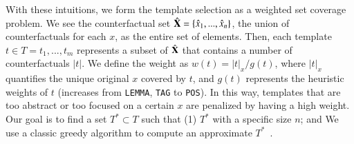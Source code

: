 With these intuitions, we form the template selection as a weighted set coverage problem.
We see the counterfactual set $\hat{\mathbf{X}} = \{\hat{x}_1,...,\hat{x}_n\}$, the union of counterfactuals for each $x$, as the entire set of elements.
Then, each template $t \in T = {t_1,...,t_m}$ represents a subset of $\hat{\mathbf{X}}$ that contains a number of counterfactuals $|t|$.
We define the weight as $w(t) = |t|_x / g(t)$, where $|t|_x$ quantifies the unique original $x$ covered by $t$, and $g(t)$ represents the heuristic weights of $t$ (increases from \texttt{LEMMA}, \texttt{TAG} to \texttt{POS}).
In this way, templates that are too abstract or too focused on a certain $x$ are penalized by having a high weight. Our goal is to find a set $T^* \subset T$ such that (1) $T^*$ with a specific size $n$; and
We use a classic greedy algorithm to compute an approximate $T^*$~\cite{vazirani2013approximation}.
